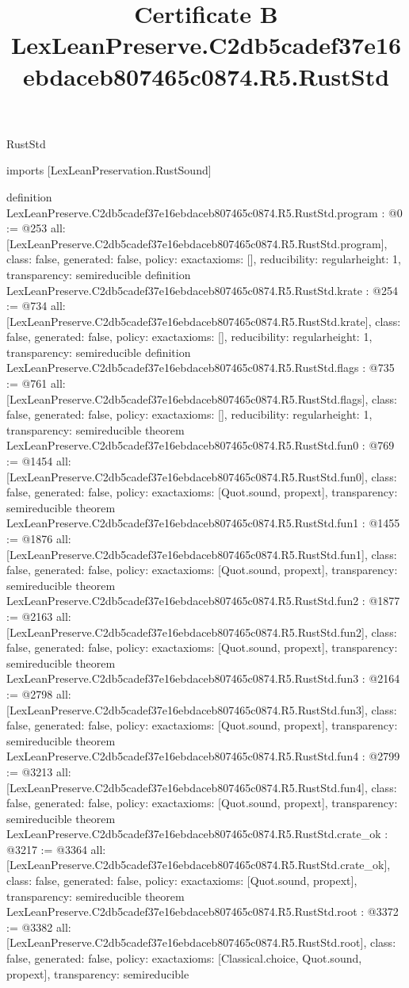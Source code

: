 \begin{lexlean}{RustStd}
\title{Certificate B LexLeanPreserve.C2db5cadef37e16ebdaceb807465c0874.R5.RustStd}
\begin{coremodule}
imports [LexLeanPreservation.RustSound]

definition LexLeanPreserve.C2db5cadef37e16ebdaceb807465c0874.R5.RustStd.program : @0 := @253 {
  all: [LexLeanPreserve.C2db5cadef37e16ebdaceb807465c0874.R5.RustStd.program],
  class: false,
  generated: false,
  policy: exact{axioms: []},
  reducibility: regular{height: 1},
  transparency: semireducible
}
definition LexLeanPreserve.C2db5cadef37e16ebdaceb807465c0874.R5.RustStd.krate : @254 := @734 {
  all: [LexLeanPreserve.C2db5cadef37e16ebdaceb807465c0874.R5.RustStd.krate],
  class: false,
  generated: false,
  policy: exact{axioms: []},
  reducibility: regular{height: 1},
  transparency: semireducible
}
definition LexLeanPreserve.C2db5cadef37e16ebdaceb807465c0874.R5.RustStd.flags : @735 := @761 {
  all: [LexLeanPreserve.C2db5cadef37e16ebdaceb807465c0874.R5.RustStd.flags],
  class: false,
  generated: false,
  policy: exact{axioms: []},
  reducibility: regular{height: 1},
  transparency: semireducible
}
theorem LexLeanPreserve.C2db5cadef37e16ebdaceb807465c0874.R5.RustStd.fun0 : @769 := @1454 {
  all: [LexLeanPreserve.C2db5cadef37e16ebdaceb807465c0874.R5.RustStd.fun0],
  class: false,
  generated: false,
  policy: exact{axioms: [Quot.sound, propext]},
  transparency: semireducible
}
theorem LexLeanPreserve.C2db5cadef37e16ebdaceb807465c0874.R5.RustStd.fun1 : @1455 := @1876 {
  all: [LexLeanPreserve.C2db5cadef37e16ebdaceb807465c0874.R5.RustStd.fun1],
  class: false,
  generated: false,
  policy: exact{axioms: [Quot.sound, propext]},
  transparency: semireducible
}
theorem LexLeanPreserve.C2db5cadef37e16ebdaceb807465c0874.R5.RustStd.fun2 : @1877 := @2163 {
  all: [LexLeanPreserve.C2db5cadef37e16ebdaceb807465c0874.R5.RustStd.fun2],
  class: false,
  generated: false,
  policy: exact{axioms: [Quot.sound, propext]},
  transparency: semireducible
}
theorem LexLeanPreserve.C2db5cadef37e16ebdaceb807465c0874.R5.RustStd.fun3 : @2164 := @2798 {
  all: [LexLeanPreserve.C2db5cadef37e16ebdaceb807465c0874.R5.RustStd.fun3],
  class: false,
  generated: false,
  policy: exact{axioms: [Quot.sound, propext]},
  transparency: semireducible
}
theorem LexLeanPreserve.C2db5cadef37e16ebdaceb807465c0874.R5.RustStd.fun4 : @2799 := @3213 {
  all: [LexLeanPreserve.C2db5cadef37e16ebdaceb807465c0874.R5.RustStd.fun4],
  class: false,
  generated: false,
  policy: exact{axioms: [Quot.sound, propext]},
  transparency: semireducible
}
theorem LexLeanPreserve.C2db5cadef37e16ebdaceb807465c0874.R5.RustStd.crate_ok : @3217 := @3364 {
  all: [LexLeanPreserve.C2db5cadef37e16ebdaceb807465c0874.R5.RustStd.crate_ok],
  class: false,
  generated: false,
  policy: exact{axioms: [Quot.sound, propext]},
  transparency: semireducible
}
theorem LexLeanPreserve.C2db5cadef37e16ebdaceb807465c0874.R5.RustStd.root : @3372 := @3382 {
  all: [LexLeanPreserve.C2db5cadef37e16ebdaceb807465c0874.R5.RustStd.root],
  class: false,
  generated: false,
  policy: exact{axioms: [Classical.choice, Quot.sound, propext]},
  transparency: semireducible
}


\end{coremodule}
\end{lexlean}
